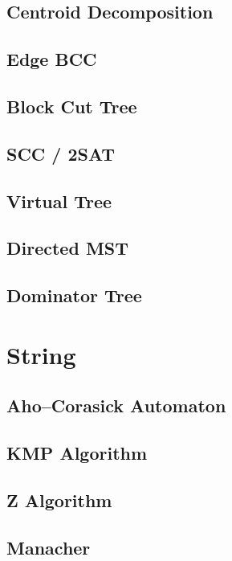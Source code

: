 \subsection{Centroid Decomposition}

\subsection{Edge BCC}

\subsection{Block Cut Tree}

\subsection{SCC / 2SAT}

\subsection{Virtual Tree}

\subsection{Directed MST}

\subsection{Dominator Tree}


\section{String}
\subsection{Aho–Corasick Automaton}

\subsection{KMP Algorithm}

\subsection{Z Algorithm}

\subsection{Manacher}

